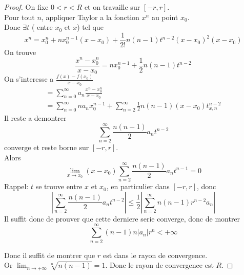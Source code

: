 \documentclass[../main.tex]{subfiles}
\begin{document}
\begin{proof}
	On fixe $0<r<R$ et on travaille sur $[-r,r]$.\\
	Pour tout $n$, appliquer Taylor a la fonction $x^{n}$ au point $x_0$.\\
	Donc $\exists t$ ( entre $x_0$ et $x$) tel que
	\[ 
		x^{n} = x_0^{n} + n x_0^{n-1} ( x-x_0) + \frac{1}{2!}n ( n-1) t ^{n-2}( x-x_0)^{2} ( x-x_0) 
	\]
On trouve
\[ 
	\frac{x^{n}-x_0^{n}}{x-x_0} = n x_0^{n-1} + \frac{1}{2}n ( n-1) t^{n-2}
\]
On s'interesse a $ \frac{f( x) - f( x_0) }{x-x_0}$
\begin{align*}
=\sum_{n=0}^{ \infty } a_n \frac{x^{n}- x_0^{n}}{x-x_0}\\
= \sum_{n=0}^{ \infty } n a_n x_0^{n-1} + \sum_{n=2}^{ \infty}\frac{1}{2}n ( n-1) ( x-x_0)  t^{n-2}_{x,n} 
\end{align*}
Il reste a demontrer 
\[ 
	\sum_{n=2}^{ \infty } \frac{n( n-1) }{2} a_n t^{n-2}
\]
converge et reste borne sur $[-r,r]$.\\
Alors 
\[ 
	\lim_{x \to x_0} ( x-x_0) \sum_{n=2}^{ \infty } \frac{n( n-1) }{2} a_n t^{n-1 } =0
\]
Rappel:
$t$ se trouve entre $x$ et $x_0$, en particulier dans $[-r,r]$, donc 
\[ 
	| \sum_{n=2}^{ \infty } \frac{n( n-1) }{2} a_n t^{n-2}| \leq \frac{1}{2} | \sum_{n=2}^{ \infty } n ( n-1) r^{n-2} a_n |
\]
Il suffit donc de prouver que cette derniere serie converge, donc de montrer
\[ 
	\sum_{n=2}^{ \infty }( n-1) n |a_n| r^{n} < + \infty 	
\]

Donc il suffit de montrer que $r$ est dans le rayon de convergence.\\
Or $ \lim_{n \to  + \infty} \sqrt[n] { n ( n-1) } =1$.
Donc le rayon de convergence est $R$.


\end{proof}
\end{document}
